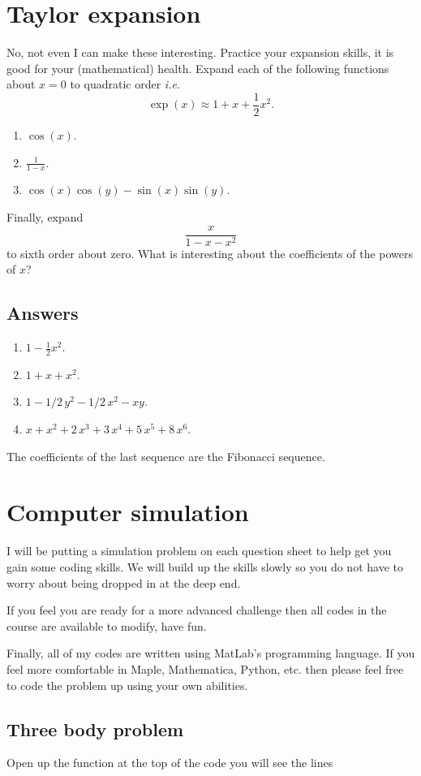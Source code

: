 \documentclass[10pt]{article}
\newcommand{\bb}{\begin{equation}}
\newcommand{\ee}{\end{equation}}
\newcommand{\ie}{\emph{i.e.} }
\begin{document}
\section{Taylor expansion}
No, not even I can make these interesting. Practice your expansion skills, it is good for your (mathematical) health. Expand each of the following functions about $x=0$ to quadratic order \ie
\bb
\exp(x)\approx 1+x+\frac{1}{2}x^2.
\ee
\begin{enumerate}
\item $\cos(x)$.
\item $\frac{1}{1-x}$.
\item $\cos(x)\cos(y)-\sin(x)\sin(y)$.
\end{enumerate}
Finally, expand 
\bb
\frac{x}{1-x-x^2}
\ee
to sixth order about zero. What is interesting about the coefficients of the powers of $x$?
\begin{Answ}
\subsection{Answers}
\begin{enumerate}
\item $1-{\frac {1}{2}}{x}^{2}$.
\item $1+x+{x}^{2}$.
\item $1-1/2\,{y}^{2}-1/2\,{x}^{2}-xy$.
\item $x+{x}^{2}+2\,{x}^{3}+3\,{x}^{4}+5\,{x}^{5}+8\,{x}^{6}$.
\end{enumerate}
The coefficients of the last sequence are the Fibonacci sequence.
\end{Answ}
\section{Computer simulation}
I will be putting a simulation problem on each question sheet to help get you gain some coding skills. We will build up the skills slowly so you do not have to worry about being dropped in at the deep end.

If you feel you are ready for a more advanced challenge then all codes in the course are available to modify, have fun.

Finally, all of my codes are written using MatLab's programming language. If you feel more comfortable in Maple, Mathematica, Python, etc. then please feel free to code the problem up using your own abilities.
\subsection*{Three body problem}
Open up the function  at the top of the code you will see the lines
\end{document}
